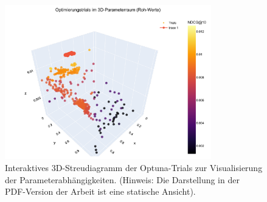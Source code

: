 
\begin{figure}[H]
    \centering
    \includegraphics[width=0.8\textwidth]{content/figures/svg/3d_scatter_plot.pdf}
    \caption{Interaktives 3D-Streudiagramm der Optuna-Trials zur Visualisierung der Parameterabhängigkeiten. (Hinweis: Die Darstellung in der PDF-Version der Arbeit ist eine statische Ansicht).}
    \label{fig:3d_scatter}
\end{figure}